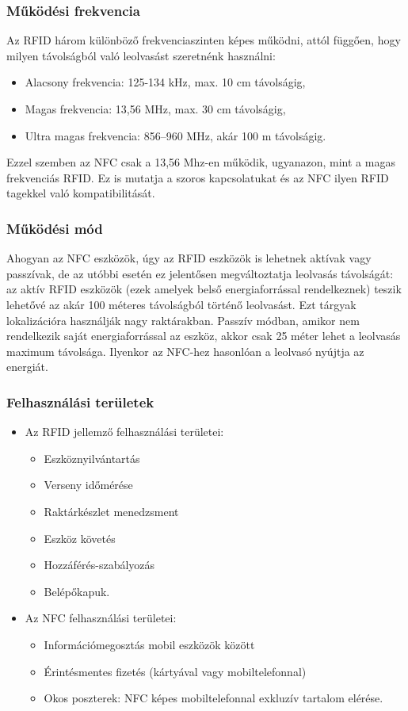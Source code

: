 \documentclass[12pt]{article}
\begin{document}
\subsubsection{Működési frekvencia}
Az RFID három különböző frekvenciaszinten képes működni, attól függően, hogy milyen 
távolságból való leolvasást szeretnénk használni:
\begin{itemize}
\item Alacsony frekvencia: 125-134 kHz, max. 10 cm távolságig,
\item Magas frekvencia: 13,56 MHz, max. 30 cm távolságig,
\item Ultra magas frekvencia: 856--960 MHz, akár 100 m távolságig.
\end{itemize}

Ezzel szemben az NFC csak a 13,56 Mhz-en működik, ugyanazon, mint a magas frekvenciás RFID.
Ez is mutatja a szoros kapcsolatukat és az NFC ilyen RFID tagekkel való kompatibilitását.

\subsubsection{Működési mód}
Ahogyan az NFC eszközök, úgy az RFID eszközök is lehetnek aktívak vagy passzívak, de 
az utóbbi esetén ez jelentősen megváltoztatja leolvasás távolságát: az aktív RFID
eszközök (ezek amelyek belső energiaforrással rendelkeznek) teszik lehetővé 
az akár 100 méteres távolságból történő leolvasást. Ezt tárgyak lokalizációra 
használják nagy raktárakban. Passzív módban, amikor nem rendelkezik saját
energiaforrással az eszköz, akkor csak 25 méter lehet a leolvasás maximum távolsága.
Ilyenkor az NFC-hez hasonlóan a leolvasó nyújtja az energiát.

\subsubsection{Felhasználási területek}
\begin{itemize}
\item
Az RFID jellemző felhasználási területei:
\begin{itemize}
\item Eszköznyilvántartás
\item Verseny időmérése
\item Raktárkészlet menedzsment
\item Eszköz követés
\item Hozzáférés-szabályozás
\item Belépőkapuk.
\end{itemize}

\item
Az NFC felhasználási területei:
\begin{itemize}
\item Információmegosztás mobil eszközök között
\item Érintésmentes fizetés (kártyával vagy mobiltelefonnal)
\item Okos poszterek: NFC képes mobiltelefonnal exkluzív tartalom elérése.
\end{itemize}
\end{itemize}
\end{document}
